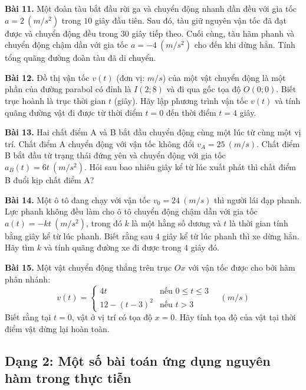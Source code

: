 \documentclass[12pt]{article}
\begin{document}
	\begin{btdo}[]
		\textbf{Bài 11.} Một đoàn tàu bắt đầu rời ga và chuyển động nhanh dần đều với gia tốc $a = 2 \ (m/s^2)$ trong $10$ giây đầu tiên. Sau đó, tàu giữ nguyên vận tốc đã đạt được và chuyển động đều trong $30$ giây tiếp theo. Cuối cùng, tàu hãm phanh và chuyển động chậm dần với gia tốc $a = -4 \ (m/s^2)$ cho đến khi dừng hẳn. Tính tổng quãng đường đoàn tàu đã di chuyển.
		
		\textbf{Bài 12.} Đồ thị vận tốc $v(t)$ (đơn vị: $m/s$) của một vật chuyển động là một phần của đường parabol có đỉnh là $I(2; 8)$ và đi qua gốc tọa độ $O(0;0)$. Biết trục hoành là trục thời gian $t$ (giây). Hãy lập phương trình vận tốc $v(t)$ và tính quãng đường vật đi được từ thời điểm $t = 0$ đến thời điểm $t = 4$ giây.
		
		\textbf{Bài 13.} Hai chất điểm A và B bắt đầu chuyển động cùng một lúc từ cùng một vị trí. Chất điểm A chuyển động với vận tốc không đổi $v_A = 25 \ (m/s)$. Chất điểm B bắt đầu từ trạng thái đứng yên và chuyển động với gia tốc $a_B(t) = 6t \ (m/s^2)$. Hỏi sau bao nhiêu giây kể từ lúc xuất phát thì chất điểm B đuổi kịp chất điểm A?
		
		\textbf{Bài 14.} Một ô tô đang chạy với vận tốc $v_0 = 24 \ (m/s)$ thì người lái đạp phanh. Lực phanh không đều làm cho ô tô chuyển động chậm dần với gia tốc $a(t) = -kt \ (m/s^2)$, trong đó $k$ là một hằng số dương và $t$ là thời gian tính bằng giây kể từ lúc phanh. Biết rằng sau $4$ giây kể từ lúc phanh thì xe dừng hẳn. Hãy tìm $k$ và tính quãng đường xe đi được trong $4$ giây đó.
		
		\textbf{Bài 15.} Một vật chuyển động thẳng trên trục $Ox$ với vận tốc được cho bởi hàm phân nhánh:
		$$v(t) = \begin{cases} 4t & \text{nếu } 0 \le t \le 3 \\ 12 - (t - 3)^2 & \text{nếu } t > 3 \end{cases} \quad (m/s)$$
		Biết rằng tại $t = 0$, vật ở vị trí có tọa độ $x = 0$. Hãy tính tọa độ của vật tại thời điểm vật dừng lại hoàn toàn.
	\end{btdo}
	
	\subsection{Dạng 2: Một số bài toán ứng dụng nguyên hàm trong thực tiễn}
	
\end{document}

